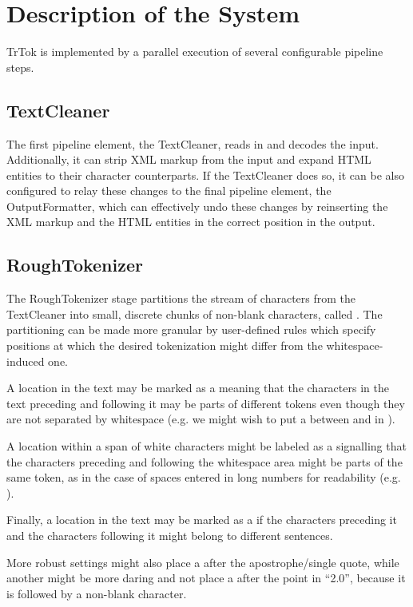 \section{Description of the System}
\label{sec:system}

TrTok is implemented by a parallel execution of several configurable
pipeline steps.

\subsection{TextCleaner}

The first pipeline element, the TextCleaner, reads in and decodes the
input. Additionally, it can strip XML markup from the input and expand
HTML entities to their character counterparts. If the TextCleaner does
so, it can be also configured to relay these changes to the final
pipeline element, the OutputFormatter, which can effectively undo
these changes by reinserting the XML markup and the HTML entities in
the correct position in the output.

\subsection{RoughTokenizer}

The RoughTokenizer stage partitions the stream of characters from the
TextCleaner into small, discrete chunks of non-blank characters,
called . The partitioning can be made more
granular by user-defined rules which specify positions at which the
desired tokenization might differ from the whitespace-induced one.

A location in the text may be marked as a \maysplit{} meaning that the
characters in the text preceding and following it may be parts of
different tokens even though they are not separated by whitespace
(e.g. we might wish to put a \maysplit{} between  and
 in ).

A location within a span of white characters might be labeled as a
\mayjoin{} signalling that the characters preceding and following the
whitespace area might be parts of the same token, as in the case of
spaces entered in long numbers for readability (e.g.
).

Finally, a location in the text may be marked as a \maybreaksentence{}
if the characters preceding it and the characters following it might
belong to different sentences.

More robust settings might also place a \maybreaksentence{} after the
apostrophe/single quote, while another might be more daring and not
place a \maybreaksentence{} after the point in ``2.0'', because it is
followed by a non-blank character.

